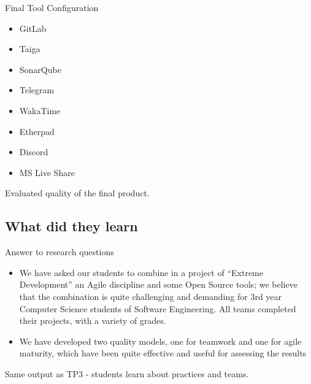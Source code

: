 Final Tool Configuration

\begin{itemize}
    \item GitLab
    \item Taiga
    \item SonarQube
    \item Telegram
    \item WakaTime
    \item Etherpad
    \item Discord
    \item MS Live Share
\end{itemize}

Evaluated quality of the final product.

\subsection{What did they learn}

Answer to research questions

\begin{itemize}
    \item We have asked our students to combine in a project of
“Extreme Development” an Agile discipline and some Open Source tools; we
believe that the combination is quite challenging and demanding for 3rd year
Computer Science students of Software Engineering. All teams completed their
projects, with a variety of grades.
    \item We have developed two quality models, one for teamwork
and one for agile maturity, which have been quite effective and useful for assessing
the results
\end{itemize}

Same output as TP3 - students learn about practices and teams.


